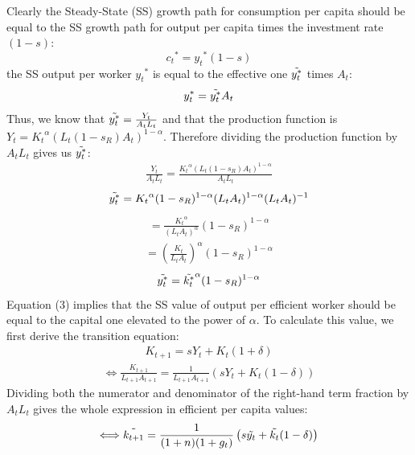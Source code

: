 \documentclass[11pt]{article} %
\begin{document}
Clearly the Steady-State (SS) growth path for consumption per capita should be equal to the SS growth path for output per capita times the investment rate $(1-s)$:
\begin{equation}
    {c_t}^*={y_t}^{*}(1-s)
\end{equation}
the SS output per worker ${y_t}^*$ is equal to the effective one $\Tilde{y_t^*}$ times $A_t$:
\begin{equation}
    y_t^*=\Tilde{y_t^*}A_t
\end{equation}
Thus, we know that $\Tilde{y_t^*}=\frac{Y_t}{{A_t}{L_t}}$ and that the production function is $Y_t={K_t}^{\alpha}\left({L_t}(1-{s_R}){A_t}\right)^{1-\alpha}$. Therefore dividing the production function by $A_tL_t$ gives us $\Tilde{y_t^*}$:
\begin{align*}
    \frac{Y_t}{A_tL_t}=\frac{{K_t}^{\alpha}\left(L_t(1-{s_R})A_t\right)^{1-\alpha}}{A_tL_t}
\end{align*}
\begin{align*}
    \Tilde{y_t^*}={K_t}^{\alpha}(1-s_R)^{1-\alpha}(L_tA_t)^{1-\alpha}(L_tA_t)^{-1}
\end{align*}
\begin{align*}
    =\frac{{K_t}^\alpha}{(L_tA_t)^{\alpha}}(1-{s_R})^{1-\alpha}
\end{align*}
\begin{align*}
    =\left(\frac{{K_t}}{L_tA_t}\right)^{\alpha}(1-{s_R})^{1-\alpha}
\end{align*}
\begin{equation}
    \Tilde{y_t^*}=\Tilde{k_t^*}^{\alpha}(1-{s_R})^{1-\alpha}
\end{equation}
Equation (3) implies that the SS value of output per efficient worker should be equal to the capital one elevated to the power of $\alpha$. To calculate this value, we first derive the transition equation:
\begin{align*}
    K_{t+1}=sY_t+K_t(1+\delta)    
\end{align*}
\begin{align*}
    \Longleftrightarrow\frac{K_{t+1}}{{L_{t+1}}{A_{t+1}}}=\frac{1}{{{L_{t+1}}{A_{t+1}}}}\left(sY_t+K_t(1-\delta)\right)
\end{align*}
Dividing both the numerator and denominator of the right-hand term fraction by $A_tL_t$ gives the whole expression in efficient per capita values:
\begin{align*}
    \Longleftrightarrow\Tilde{k_{t+1}}=\frac{1}{(1+n)(1+g_t)}\left(s\Tilde{y_t}+\Tilde{k_t}(1-\delta)\right)
\end{align*}
\end{document}
